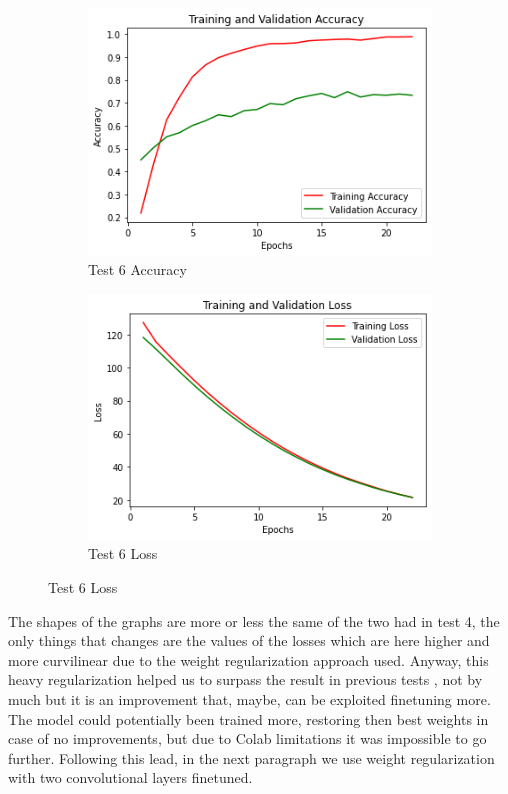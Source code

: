 \begin{figure}[H]
	\begin{subfigure}{0.5\textwidth}
		\includegraphics[width=0.9\linewidth]{img/vgg16/vgg16ft1dropregacc.png} 
		\caption{Test 6 Accuracy}
		\label{fig:vgg16ft1dropregacc}
	\end{subfigure}
	\begin{subfigure}{0.5\textwidth}
		\includegraphics[width=0.9\linewidth]{img/vgg16/vgg16ft1dropregloss.png}
		\caption{Test 6 Loss}
		\label{fig:vgg16ft1dropregloss}
	\end{subfigure}
\end{figure}

The shapes of the graphs are more or less the same of the two had in test 4, the only things that changes are the values of the losses which are here higher and more curvilinear due to the weight regularization approach used. Anyway, this heavy regularization helped us to surpass the result in previous tests , not by much but it is an improvement that, maybe, can be exploited finetuning more. The model could potentially been trained more, restoring then best weights in case of no improvements, but due to Colab limitations it was impossible to go further. Following this lead, in the next paragraph we use weight regularization with two convolutional layers finetuned.






